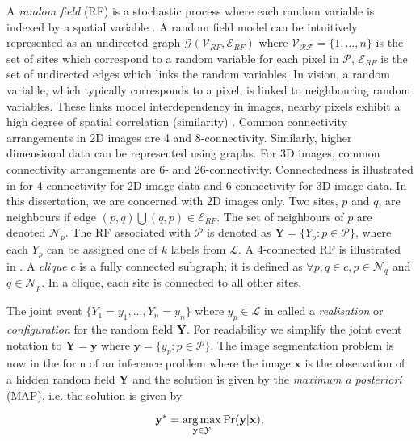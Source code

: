 A \textit{random field} (RF) is a stochastic process where each random variable is indexed by a spatial variable \citep{Adler2007,Gikhman1996}.
A random field model can be intuitively represented as an undirected graph $\mathcal{G}(\mathcal{V}_{RF},\mathcal{E}_{RF})$ where $\mathcal{V_{RF}} = \{1, \ldots, n\}$ is the set of sites which correspond to a random variable for each pixel in $\mathcal{P}$, $\mathcal{E}_{RF}$ is the set of undirected edges which links the random variables.
In vision, a random variable, which typically corresponds to a pixel, is linked to neighbouring random variables.
These links model interdependency in images, nearby pixels exhibit a high degree of spatial correlation (similarity) \citep{Brett2003}.
Common connectivity arrangements in 2D images are 4 and 8-connectivity.
Similarly, higher dimensional data can be represented using graphs.
For 3D images, common connectivity arrangements are 6- and 26-connectivity.
Connectedness is illustrated in  for 4-connectivity for 2D image data and 6-connectivity for 3D image data.
In this dissertation, we are concerned with 2D images only.
Two sites, $p$ and $q$, are neighbours if edge $(p,q) \bigcup (q,p) \in \mathcal{E}_{RF}$.
The set of neighbours of $p$ are denoted $\mathcal{N}_p$.
The RF associated with $\mathcal{P}$ is denoted as $\mathbf{Y} = \{Y_p:p \in \mathcal{P}\}$, where each $Y_p$ can be assigned one of $k$ labels from $\mathcal{L}$.
A 4-connected RF is illustrated in .
A \textit{clique} $c$ is a fully connected subgraph; it is defined as $\forall p,q \in c, p \in \mathcal{N}_q$ and $q \in \mathcal{N}_p$.
In a clique, each site is connected to all other sites.

The joint event $\{Y_1=y_1, \ldots, Y_n=y_n\}$ where $y_p \in \mathcal{L}$ in called a \textit{realisation} or \textit{configuration} for the random field $\mathbf{Y}$.
For readability we simplify the joint event notation to $\mathbf{Y}=\mathbf{y}$ where $\mathbf{y}=\{y_p : p \in \mathcal{P}\}$.
The image segmentation problem is now in the form of an inference problem where the image $\mathbf{x}$ is the observation of a hidden random field $\mathbf{Y}$ and the solution is given by the \textit{maximum a posteriori} (MAP), i.e. the solution is given by

\begin{equation}
	\mathbf{y^*} = \operatorname*{arg\,max}_{\mathbf{y} \in \mathcal{Y}}\Pr(\mathbf{y}|\mathbf{x}),
	\label{eq:mrfprobability}
\end{equation}

